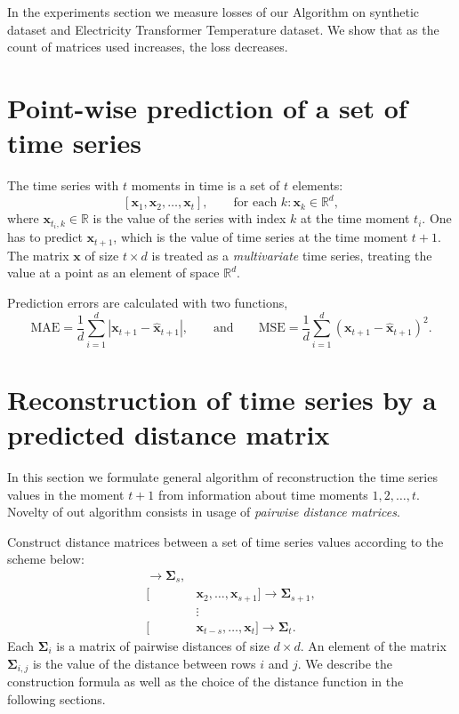 \documentclass[12pt]{article}
\begin{document}
	In the experiments section we measure losses of our Algorithm on synthetic dataset and Electricity Transformer Temperature dataset. We show that as the count of matrices used increases, the loss decreases.

\section{Point-wise prediction of a set of time series}

The time series with $t$ moments in time is a set of $t$ elements:
\[
[\mathbf{x}_1, \mathbf{x}_2, \ldots, \mathbf{x}_t],\qquad \text{for each } k: \mathbf{x}_k \in \mathbb{R}^d,
\]
where $\mathbf{x}_{t_i, k} \in \mathbb{R}$ is the value of the series with index $k$ at the time moment $t_i$.
One has to predict $\mathbf{x}_{t+1}$, which is the value of time series at the time moment $t+1$. The matrix $\mathbf{x}$ of size $t \times d$ is treated as a \emph{multivariate} time series, treating the value at a point as an element of space $\mathbb{R}^d$.

Prediction errors are calculated with two functions,
\[
\text{MAE} = \frac{1}{d}{\sum_{i=1}^{d} |\mathbf{x}_{t+1} - \mathbf{\hat{x}}_{t+1}|}, 
\qquad \text{and} \qquad 
\text{MSE} = \frac{1}{d}{\sum_{i=1}^{d} (\mathbf{x}_{t+1} - \mathbf{\hat{x}}_{t+1})^2}.
\]

\section{Reconstruction of time series by a predicted distance matrix}

In this section we formulate general algorithm of reconstruction the time series values in the moment $t+1$ from information about time moments $1, 2, \ldots, t$. Novelty of out algorithm consists in usage of \emph{pairwise distance matrices}.

Construct distance matrices between a set of time series values according to the scheme below:
\begin{align*}
	[&\mathbf{x}_1, \ldots, \mathbf{x}_s] \rightarrow \mathbf{\Sigma}_s, \\
	[&\mathbf{x}_2, \ldots, \mathbf{x}_{s+1}] \rightarrow \mathbf{\Sigma}_{s+1}, \\
	&\vdots \\
	[&\mathbf{x}_{t-s}, \ldots, \mathbf{x}_t] \rightarrow \mathbf{\Sigma}_{t}.
\end{align*}
Each $\mathbf{\Sigma}_i$ is a matrix of pairwise distances of size $d \times d$. An element of the matrix $\mathbf{\Sigma}_{i,j}$ is the value of the distance between rows $i$ and $j$. We describe the construction formula as well as the choice of the distance function in the following sections.
\end{document}
